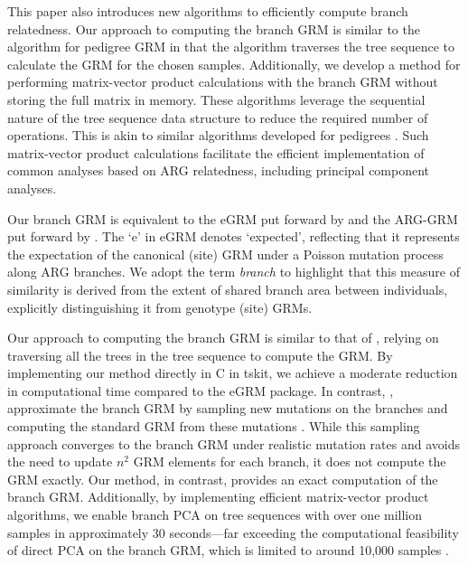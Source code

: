 This paper also introduces new algorithms to efficiently compute branch relatedness. 
Our approach to computing the branch GRM is similar to the algorithm for pedigree GRM \citep{emik1949systematic, cruden1949computation, henderson1976simple} in that the algorithm traverses the tree sequence to calculate the GRM for the chosen samples. Additionally, we develop a method for performing matrix-vector product calculations with the branch GRM without storing the full matrix in memory.  These algorithms leverage the sequential nature of the tree sequence data structure to reduce the required number of operations.  This is akin to similar algorithms developed for pedigrees \citep{colleau2002indirect}. Such matrix-vector product calculations facilitate the efficient implementation of common analyses based on ARG relatedness, including principal component analyses.

Our branch GRM is equivalent to the eGRM put forward by \cite{fan2022genealogical} and the ARG-GRM put forward by \cite{zhang2023biobank}. The `e' in eGRM denotes `expected', reflecting that it represents the expectation of the canonical (site) GRM under a Poisson mutation process along ARG branches. We adopt the term \textit{branch} to highlight that this measure of similarity is derived from the extent of shared branch area between individuals, explicitly distinguishing it from genotype (site) GRMs.

Our approach to computing the branch GRM is similar to that of \cite{fan2022genealogical}, relying on traversing all the trees in the tree sequence to compute the GRM. By implementing our method directly in C in tskit, we achieve a moderate reduction in computational time compared to the eGRM package. In contrast, \cite{zhang2023biobank}, approximate the branch GRM by sampling new mutations on the branches and computing the standard GRM from these mutations
\citep{vanraden2008efficient, yang2010common}. While this sampling approach converges to the branch GRM under realistic mutation rates and avoids the need to update $n^2$ GRM elements for each branch, it does not compute the GRM exactly. Our method, in contrast, provides an exact computation of the branch GRM. Additionally, by implementing efficient matrix-vector product algorithms, we enable branch PCA on tree sequences with over one million samples in approximately 30 seconds—far exceeding the computational feasibility of direct PCA on the branch GRM, which is limited to around 10,000 samples \citep{fan2022genealogical}.


